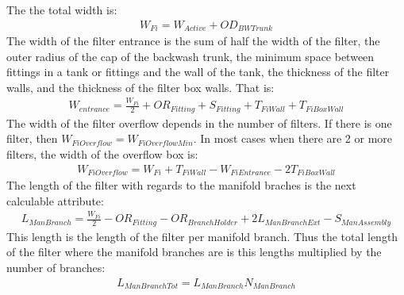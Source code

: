 \documentclass[letterpaper,10pt,english]{sphinxmanual}
\begin{document}
The the total width is:
\begin{equation}\label{equation:Filtration/Filtration_Derivations:Filtration/Filtration_Derivations:35}
\begin{split}W_{Fi} = W_{Active} + OD_{BWTrunk}\end{split}
\end{equation}
The width of the filter entrance is the sum of half the width of the filter, the outer radius of the cap of the backwash trunk, the minimum space between fittings in a tank or fittings and the wall of the tank, the thickness of the filter walls, and the thickness of the filter box walls. That is:
\begin{equation}\label{equation:Filtration/Filtration_Derivations:Filtration/Filtration_Derivations:36}
\begin{split}W_{entrance} = \frac{W_{Fi}}{2} + OR_{Fitting} + S_{Fitting} + T_{FiWall} + T_{FiBoxWall}\end{split}
\end{equation}
The width of the filter overflow depends in the number of filters. If there is one filter, then \(W_{FiOverflow} = W_{FiOverflowMin}\). In most cases when there are 2 or more filters, the width of the overflow box is:
\begin{equation}\label{equation:Filtration/Filtration_Derivations:Filtration/Filtration_Derivations:37}
\begin{split}W_{FiOverflow} = W_{Fi} + T_{FiWall} - W_{FiEntrance} - 2T_{FiBoxWall}\end{split}
\end{equation}
The length of the filter with regards to the manifold braches is the next calculable attribute:
\begin{equation}\label{equation:Filtration/Filtration_Derivations:Filtration/Filtration_Derivations:38}
\begin{split}L_{ManBranch} = \frac{W_{Fi}}{2} - OR_{Fitting} - OR_{BranchHolder} + 2L_{ManBranchExt} - S_{ManAssembly}\end{split}
\end{equation}
This length is the length of the filter per manifold branch.  Thus the total length of the filter where the manifold branches are is this lengths multiplied by the number of branches:
\begin{equation}\label{equation:Filtration/Filtration_Derivations:Filtration/Filtration_Derivations:39}
\begin{split}L_{ManBranchTot} = L_{ManBranch}N_{ManBranch}\end{split}
\end{equation}
\end{document}

